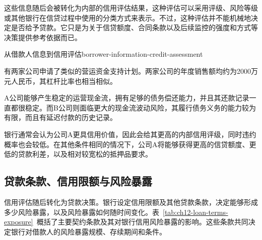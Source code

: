这些信息随后会被转化为内部的信用评估结果，这种评估可以采用评级、风险等级或其他银行在信贷过程中使用的分类方式来表示。不过，这种评估并不能机械地决定是否给予贷款。它只是为关于信贷额度、合同条款以及后续监控的强度和方式等决策提供参考依据而已。

\begin{example}{从借款人信息到信用评估}{borrower-information-credit-assessment}

有两家公司申请了类似的营运资金支持计划。两家公司的年度销售额均约为2000万元人民币，其杠杆比率也相当相似。

A公司能够产生稳定的运营现金流，拥有足够的债务偿还能力，并且其还款记录一直都很稳定。而B公司则面临更大的现金流波动风险，其履行债务义务的能力较为有限，而且有延迟付款的历史记录。

银行通常会认为公司A更具信用价值，因此会给其更高的内部信用评级，同时违约概率也会较低。在其他条件相同的情况下，公司A将能够获得更高的信贷额度、更低的贷款利差，以及相对较宽松的抵押品要求。

\end{example}



\subsection{贷款条款、信用限额与风险暴露}

信用评估随后转化为贷款决策。银行设定信用限额及其他贷款条款，决定能够形成多少风险暴露，以及风险暴露如何随时间变化。表~\ref{tab:ch12-loan-terms-exposure}~概括了主要契约条款及其对银行信用风险暴露的影响。这些条款共同决定银行对借款人的风险暴露规模、存续期间和条件。

